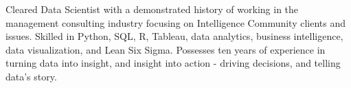 

\begin{cvparagraph}

Cleared Data Scientist with a demonstrated history of working in the management consulting industry focusing on Intelligence Community clients and issues. Skilled in Python, SQL, R, Tableau, data analytics, business intelligence, data visualization, and Lean Six Sigma. Possesses ten years of experience in turning data into insight, and insight into action - driving decisions, and telling data's story.

\end{cvparagraph}